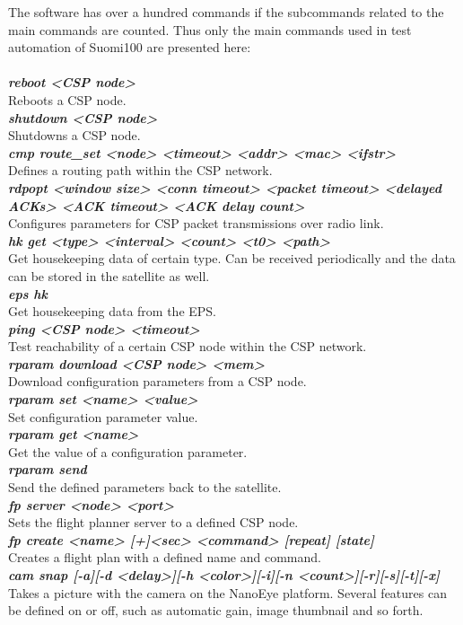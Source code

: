 \documentclass[english,12pt,a4paper,pdftex,elec,utf8]{aaltothesis}
\begin{document}
The software has over a hundred commands if the subcommands related to the main commands are counted. Thus only the main commands used in test automation of Suomi100 are presented here:\\
\\
\textit{\textbf{reboot <CSP node>}}\\
Reboots a CSP node.\\
\textit{\textbf{shutdown <CSP node>}}\\
Shutdowns a CSP node.\\
\textit{\textbf{cmp route\_set <node> <timeout> <addr> <mac> <ifstr>}}\\
Defines a routing path within the CSP network.\\
\textit{\textbf{rdpopt <window size> <conn timeout> <packet timeout> <delayed ACKs> <ACK timeout> <ACK delay count>}}\\
Configures parameters for CSP packet transmissions over radio link.\\
\textit{\textbf{hk get <type> <interval> <count> <t0> <path>}}\\
Get housekeeping data of certain type. Can be received periodically and the data can be stored in the satellite as well.\\
\textit{\textbf{eps hk}}\\
Get housekeeping data from the EPS.\\ 
\textit{\textbf{ping <CSP node> <timeout>}}\\
Test reachability of a certain CSP node within the CSP network.\\
\textit{\textbf{rparam download <CSP node> <mem>}}\\
Download configuration parameters from a CSP node.\\ 
\textit{\textbf{rparam set <name> <value>}}\\
Set configuration parameter value.\\ 
\textit{\textbf{rparam get <name>}}\\
Get the value of a configuration parameter.\\ 
\textit{\textbf{rparam send}}\\
Send the defined parameters back to the satellite.\\
\textit{\textbf{fp server <node> <port>}}\\
Sets the flight planner server to a defined CSP node.\\
\textit{\textbf{fp create <name> [+]<sec> <command> [repeat] [state]}}\\
Creates a flight plan with a defined name and command.\\
\textit{\textbf{cam snap [-a][-d <delay>][-h <color>][-i][-n <count>][-r][-s][-t][-x]}}\\
Takes a picture with the camera on the NanoEye platform. Several features can be defined on or off, such as automatic gain, image thumbnail and so forth.\\
\end{document}
